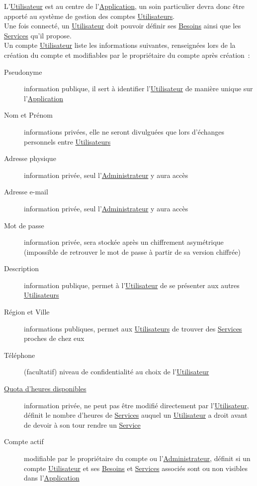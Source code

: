 \documentclass[french]{article}
\begin{document}
			L’\hyperlink{utilisateur}{Utilisateur} est au centre de
			 l’\hyperlink{application}{Application}, un soin particulier devra donc
			 être apporté au système de gestion des comptes
			 \hyperlink{utilisateur}{Utilisateurs}.\\
			Une fois connecté, un \hyperlink{utilisateur}{Utilisateur} doit pouvoir
			 définir ses \hyperlink{besoin}{Besoins} ainsi que les
			 \hyperlink{service}{Services} qu’il propose.\\
			
			Un compte \hyperlink{utilisateur}{Utilisateur} liste les informations
			 suivantes, renseignées lors de la création du compte et modifiables par
			 le propriétaire du compte après création :
			\begin{description}
				\item [Pseudonyme]
					information publique, il sert à identifier
					 l’\hyperlink{utilisateur}{Utilisateur} de manière unique sur
					 l’\hyperlink{application}{Application}
				\item [Nom et Prénom]
					informations privées, elle ne seront divulguées que lors d’échanges
					 personnels entre \hyperlink{utilisateur}{Utilisateurs}
				\item [Adresse physique]
					information privée, seul l’\hyperlink{administrateur}{Administrateur}
					 y aura accès
				\item [Adresse e-mail]
					information privée, seul l’\hyperlink{administrateur}{Administrateur}
					 y aura accès
				\item [Mot de passe]
					information privée, sera stockée après un chiffrement asymétrique
					 (impossible de retrouver le mot de passe à partir de sa version
					 chiffrée)
				\item [Description]
					information publique, permet à l’\hyperlink{utilisateur}{Utilisateur}
					 de se présenter aux autres \hyperlink{utilisateur}{Utilisateurs}
				\item [Région et Ville]
					informations publiques, permet aux
					 \hyperlink{utilisateur}{Utilisateurs} de trouver des
					 \hyperlink{service}{Services} proches de chez eux
				\item [Téléphone]
					(facultatif) niveau de confidentialité au choix de
					 l’\hyperlink{utilisateur}{Utilisateur}
				\item [\hyperlink{quota}{Quota d’heures disponibles}]
					information privée, ne peut pas être modifié directement par
					 l’\hyperlink{utilisateur}{Utilisateur}, définit le nombre d’heures de
					 \hyperlink{service}{Services} auquel un
					 \hyperlink{utilisateur}{Utilisateur} a droit avant de devoir à son
					 tour rendre un \hyperlink{service}{Service}
				\item [Compte actif]
					modifiable par le propriétaire du compte ou
					 l’\hyperlink{administrateur}{Administrateur}, définit si un compte
					 \hyperlink{utilisateur}{Utilisateur} et ses
					 \hyperlink{besoin}{Besoins} et \hyperlink{service}{Services} associés
					 sont ou non visibles dans l’\hyperlink{application}{Application}
			\end{description}
			
\end{document}

